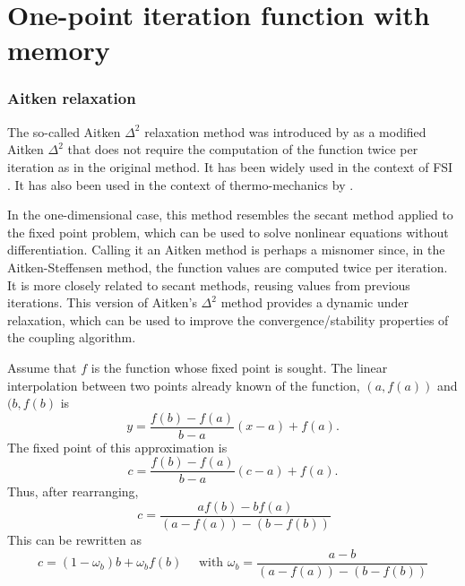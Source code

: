 \section{One-point iteration function with memory}

\subsubsection{Aitken relaxation}



The so-called Aitken \(\Delta^2\) relaxation method was introduced by \cite{irons_version_1969} as a modified Aitken \(\Delta^2\) that does not require the computation of the function twice per iteration as in the original method.
It has been widely used in the context of FSI \citep{irons_version_1969, kuttler_fixed-point_2008, joosten_analysis_2009, kuttler_vector_2009, erbts_partitioned_2015, wendt_partitioned_2015}.
It has also been used in the context of thermo-mechanics by \cite{danowski_monolithic_2013}.

In the one-dimensional case, this method resembles the secant method applied to the fixed point problem, which can be used to solve nonlinear equations without differentiation.
Calling it an Aitken method is perhaps a misnomer since, in the Aitken-Steffensen method, the function values are computed twice per iteration.
It is more closely related to secant methods, reusing values from previous iterations.
This version of Aitken's \(\Delta^2\) method provides a dynamic under relaxation, which can be used to improve the convergence/stability properties of the coupling algorithm.

Assume that \(f\) is the function whose fixed point is sought.
The linear interpolation between two points already known of the function, \((a, f(a))\) and \((b, f(b)\) is
\begin{equation}
  y = \frac{f(b)-f(a)}{b-a}(x-a) + f(a).
\end{equation}
The fixed point of this approximation is
\begin{equation}
  c = \frac{f(b)-f(a)}{b-a}(c-a) + f(a).
\end{equation}
Thus, after rearranging,
\begin{equation}\
c=\frac{a f(b)- b f(a)}{\left(a-f(a)\right)-\left(b-f(b)\right)}
\end{equation}
This can be rewritten as
\begin{equation}
c=\left(1-\omega_{b}\right) b+\omega_{b} f(b) \quad \text { with } \omega_{b}=\frac{a-b}{\left(a-f(a)\right)-\left(b-f(b)\right)}
\end{equation}

